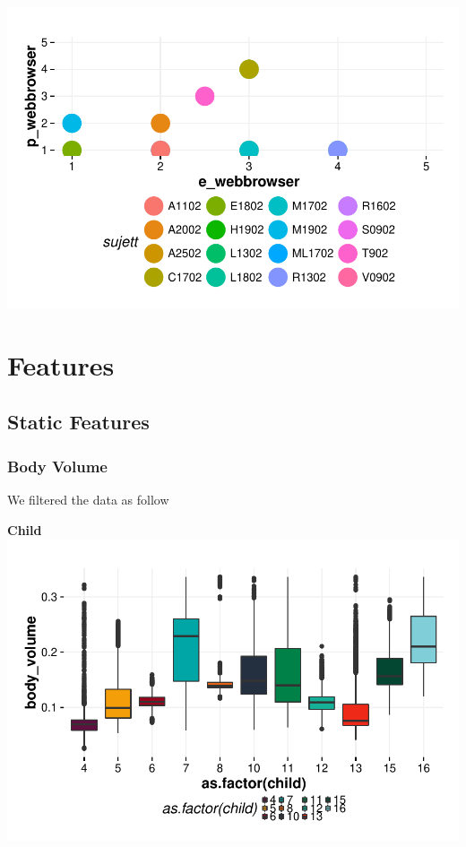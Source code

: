 \documentclass{article}
\begin{document}
\includegraphics{interviews-plot_coirs_parent_enfant_webbrowser}



\section{Features}



\subsection{Static Features}
\subsubsection{Body Volume}
We filtered the data as follow


\textbf{Child}
\includegraphics{features-plot_body_volume_child_quiz}
\end{document}

